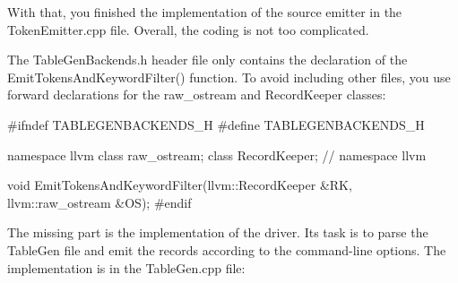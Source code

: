 With that, you finished the implementation of the source emitter in the TokenEmitter.cpp file. Overall, the coding is not too complicated.

The TableGenBackends.h header file only contains the declaration of the EmitTokensAndKeywordFilter() function. To avoid including other files, you use forward declarations for the raw\_ostream and RecordKeeper classes:

\begin{cpp}
#ifndef TABLEGENBACKENDS_H
#define TABLEGENBACKENDS_H

namespace llvm {
    class raw_ostream;
    class RecordKeeper;
} // namespace llvm

void EmitTokensAndKeywordFilter(llvm::RecordKeeper &RK,
                                llvm::raw_ostream &OS);
#endif
\end{cpp}

The missing part is the implementation of the driver. Its task is to parse the TableGen file and emit the records according to the command-line options. The implementation is in the TableGen.cpp file:

